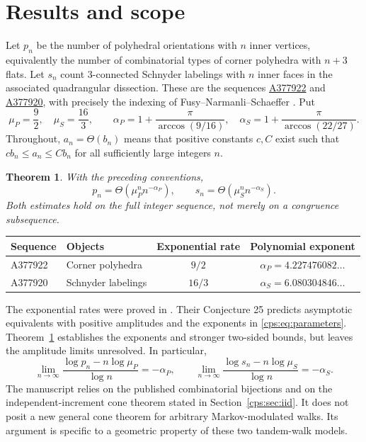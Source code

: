 \documentclass[11pt,letterpaper]{article}
\numberwithin{equation}{section}
\newtheorem{theorem}{Theorem}[section]
\theoremstyle{remark}\newtheorem{remark}[theorem]{Remark}
\begin{document}
\section{Results and scope}
Let $p_n$ be the number of polyhedral orientations with $n$ inner vertices, equivalently the number of combinatorial types of corner polyhedra with $n+3$ flats. Let $s_n$ count 3-connected Schnyder labelings with $n$ inner faces in the associated quadrangular dissection. These are the sequences \href{https://oeis.org/A377922}{A377922} and \href{https://oeis.org/A377920}{A377920}, with precisely the indexing of Fusy--Narmanli--Schaeffer \cite{FNS,OEISP,OEISS}. Put
\begin{equation}\label{cps:eq:parameters}
 \mu_P=\frac92,\quad \mu_S=\frac{16}3,\qquad
 \alpha_P=1+\frac{\pi}{\arccos(9/16)},\quad
 \alpha_S=1+\frac{\pi}{\arccos(22/27)}.
\end{equation}
Throughout, $a_n=\Theta(b_n)$ means that positive constants $c,C$ exist such that $cb_n\le a_n\le Cb_n$ for all sufficiently large integers $n$.

\begin{theorem}\label{cps:thm:main}
With the preceding conventions,
\begin{equation}\label{cps:eq:main}
 p_n=\Theta(\mu_P^n n^{-\alpha_P}),\qquad
 s_n=\Theta(\mu_S^n n^{-\alpha_S}).
\end{equation}
Both estimates hold on the full integer sequence, not merely on a congruence subsequence.
\end{theorem}

\begin{center}
\begin{tabular}{@{}llcc@{}}
\toprule
Sequence & Objects & Exponential rate & Polynomial exponent\\
\midrule
A377922 & Corner polyhedra & $9/2$ & $\alpha_P=4.227476082\ldots$\\
A377920 & Schnyder labelings & $16/3$ & $\alpha_S=6.080304846\ldots$\\
\bottomrule
\end{tabular}
\end{center}

The exponential rates were proved in \cite[Theorem 24]{FNS}. Their Conjecture 25 predicts asymptotic equivalents with positive amplitudes and the exponents in \eqref{cps:eq:parameters}. Theorem~\ref{cps:thm:main} establishes the exponents and stronger two-sided bounds, but leaves the amplitude limits unresolved. In particular,
\begin{equation}\label{cps:eq:loglimits}
 \lim_{n\to\infty}\frac{\log p_n-n\log\mu_P}{\log n}=-\alpha_P,
 \qquad
 \lim_{n\to\infty}\frac{\log s_n-n\log\mu_S}{\log n}=-\alpha_S.
\end{equation}
The manuscript relies on the published combinatorial bijections and on the independent-increment cone theorem stated in Section~\ref{cps:sec:iid}. It does not posit a new general cone theorem for arbitrary Markov-modulated walks. Its argument is specific to a geometric property of these two tandem-walk models.
\end{document}
